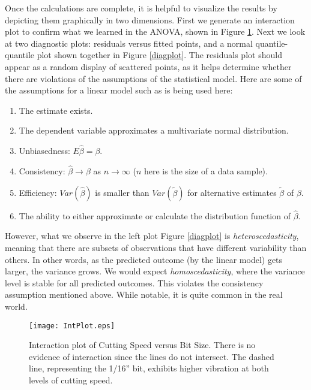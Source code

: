 Once the calculations are complete, it is helpful to visualize the results by depicting them graphically in two dimensions. First we generate an interaction plot to confirm what we learned in the ANOVA, shown in Figure \ref{intplot}. Next we look at two diagnostic plots: residuals versus fitted points, and a normal quantile-quantile plot shown together in Figure \ref{diagplot}. The residuals plot should appear as a random display of scattered points, as it helps determine whether there are violations of the assumptions of the statistical model. Here are some of the assumptions for a linear model such as is being used here:

\begin{enumerate}
	\item The estimate exists.
	\item The dependent variable approximates a multivariate normal distribution. 
	\item Unbiasedness: $E\hat{\beta} = \beta$.
	\item Consistency: $\hat{\beta}\rightarrow\beta$ as $n\rightarrow\infty$ ($n$ here is the size of a data sample).
	\item Efficiency: $Var(\hat{\beta})$ is smaller than $Var(\tilde{\beta})$ for alternative estimates $\tilde{\beta}$ of $\beta$.
	\item The ability to either approximate or calculate the distribution function of $\hat{\beta}$.
\end{enumerate}

However, what we observe in the left plot Figure \ref{diagplot} is \textit{heteroscedasticity}, meaning that there are subsets of observations that have different variability than others.\cite{Wikipedia2018} In other words, as the predicted outcome (by the linear model) gets larger, the variance grows. We would expect \textit{homoscedasticity}, where the variance level is stable for all predicted outcomes. This violates the consistency assumption mentioned above. While notable, it is quite common in the real world.


\begin{figure}
	\begin{center}
		\texttt{[image: IntPlot.eps]}
	\end{center}
	\caption{Interaction plot of Cutting Speed versus Bit Size. There is no evidence of interaction since the lines do not intersect. The dashed line, representing the 1/16'' bit, exhibits higher vibration at both levels of cutting speed.}\label{intplot}
\end{figure}


